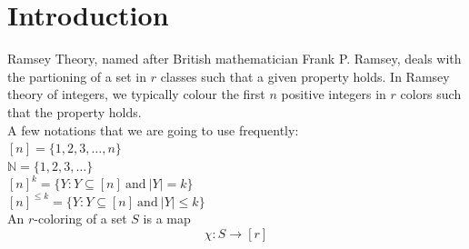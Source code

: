 \documentclass[12pt]{report}
\def\N{\mathbb N}
\begin{document}
\newpage

\tableofcontents

\newpage

\chapter{Introduction}



Ramsey Theory, named after British mathematician  Frank P. Ramsey, deals with the partioning of a set in $r$ classes such that a given property holds. In Ramsey theory of integers, we typically colour the first $n$ positive integers in $r$ colors such that the  property holds. \\

\noindent A few notations that we are going to use frequently: \\[10pt]
$[n]=\{1,2,3,\ldots,n\}$ \\[5pt]
$\N=\{1,2,3,\ldots \}$ \\[5pt]
$[n]^k=\{Y: Y \subseteq [n] \:\text{and}\: |Y| = k\}$ \\[5pt]
$[n]^{\le k}=\{Y: Y \subseteq [n] \:\text{and}\: |Y| \le k\}$ \\[5pt]

\noindent An $r$-coloring of a set $S$ is a map
\[ \chi: S \rightarrow [r] \]
\end{document}
